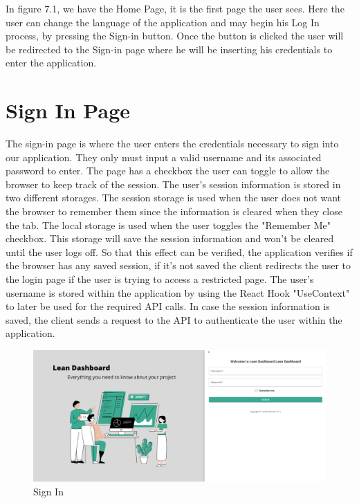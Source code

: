 \documentclass[a4paper,twoside,10pt]{report}
\begin{document}
In figure 7.1, we have the Home Page, it is the first page the user sees. Here the user can change the language of the application and may begin his Log In process, by pressing the Sign-in button. Once the button is clicked the user will be redirected to the Sign-in page where he will be inserting his credentials to enter the application.


\section{Sign In Page}
The sign-in page is where the user enters the credentials necessary to sign into our application.
They only must input a valid username and its associated password to enter.
\newline
The page has a checkbox the user can toggle to allow the browser to keep track of the session. 
The user's session information is stored in two different storages.
\newline
The session storage is used when the user does not want the browser to remember them since the information is cleared when they close the tab.
\newline
The local storage is used when the user toggles the "Remember Me" checkbox. This storage will save the session information and won't be cleared until the user logs off.
So that this effect can be verified, the application verifies if the browser has any saved session, if it's not saved the client redirects the user to the login page if the user is trying to access a restricted page.
\newline
The user's username is stored within the application by using the React Hook "UseContext" to later be used for the required API calls.
In case the session information is saved, the client sends a request to the API to authenticate the user within the application.

\begin{figure}[h!]
\center
  \includegraphics[width=\textwidth]{SignIn.png}
\caption{Sign In}
\end{figure}
\end{document}

